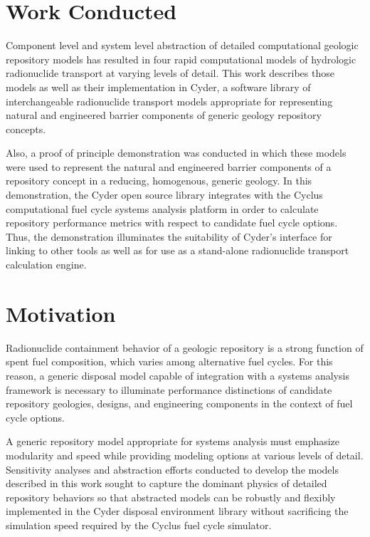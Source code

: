\documentclass[letterpaper]{article}
\begin{document}
\section{Work Conducted}

Component level and system level abstraction of detailed computational geologic 
repository models has resulted in four rapid computational models of hydrologic 
radionuclide transport at varying levels of detail. This work describes those 
models as well as their implementation in Cyder, a software library of 
interchangeable radionuclide transport models appropriate for representing 
natural and engineered barrier components of generic geology repository 
concepts.

Also, a proof of principle demonstration was conducted in which these models 
were used to represent the natural and engineered barrier components of a 
repository concept in a reducing, homogenous, generic geology.  In this 
demonstration, the Cyder open source library integrates with the Cyclus 
computational fuel cycle systems analysis platform in order to calculate 
repository performance metrics with respect to candidate fuel cycle options.  
Thus, the demonstration illuminates the suitability of Cyder's interface for 
linking to other tools as well as for use as a stand-alone radionuclide 
transport calculation engine. 

\section{Motivation}
Radionuclide containment behavior of a geologic repository is a strong function 
of spent fuel composition, which varies among alternative fuel cycles. For this 
reason, a generic disposal model capable of integration with a systems analysis 
framework is necessary to illuminate performance distinctions of candidate 
repository geologies, designs, and engineering components in the context of fuel 
cycle options. 

A generic repository model appropriate for systems analysis must emphasize 
modularity and speed while providing modeling options at various levels of 
detail. Sensitivity analyses and abstraction efforts conducted to develop the 
models described in this work sought to capture the dominant physics of detailed 
repository behaviors so that abstracted models can be robustly and flexibly 
implemented in the Cyder disposal environment library without sacrificing the 
simulation speed required by the Cyclus fuel cycle simulator.
\end{document}
